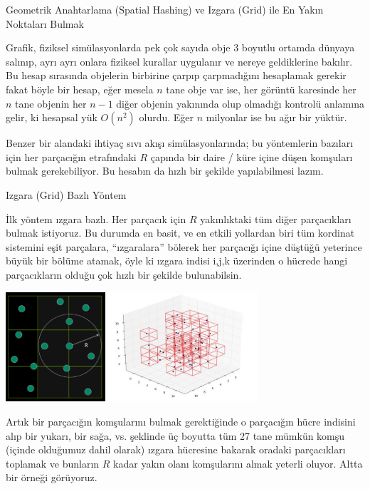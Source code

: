 \documentclass[12pt,fleqn]{article}\usepackage{../../common}
\begin{document}
Geometrik Anahtarlama (Spatial Hashing) ve Izgara (Grid) ile En Yakın Noktaları Bulmak

Grafik, fiziksel simülasyonlarda pek çok sayıda obje 3 boyutlu ortamda dünyaya
salınıp, ayrı ayrı onlara fiziksel kurallar uygulanır ve nereye geldiklerine
bakılır. Bu hesap sırasında objelerin birbirine çarpıp çarpmadığını hesaplamak
gerekir fakat böyle bir hesap, eğer mesela $n$ tane obje var ise, her görüntü
karesinde her $n$ tane objenin her $n-1$ diğer objenin yakınında olup olmadığı
kontrolü anlamına gelir, ki hesapsal yük $O(n^2)$ olurdu. Eğer $n$ milyonlar ise
bu ağır bir yüktür.

Benzer bir alandaki ihtiyaç sıvı akışı simülasyonlarında; bu yöntemlerin
bazıları için her parçacığın etrafındaki $R$ çapında bir daire / küre içine
düşen komşuları bulmak gerekebiliyor. Bu hesabın da hızlı bir şekilde
yapılabilmesi lazım.

Izgara (Grid) Bazlı Yöntem

İlk yöntem ızgara bazlı. Her parçacık için $R$ yakınlıktaki tüm diğer
parçacıkları bulmak istiyoruz. Bu durumda en basit, ve en etkili yollardan biri
tüm kordinat sistemini eşit parçalara, ``ızgaralara'' bölerek her parçacığı
içine düştüğü yeterince büyük bir bölüme atamak, öyle ki ızgara indisi i,j,k
üzerinden o hücrede hangi parçacıkların olduğu çok hızlı bir şekilde
bulunabilsin.

\includegraphics[width=10em]{algs_073_hash_03.png}
\includegraphics[width=15em]{algs_073_hash_04.jpg}

Artık bir parçacığın komşularını bulmak gerektiğinde o parçacığın hücre indisini
alıp bir yukarı, bir sağa, vs. şeklinde üç boyutta tüm 27 tane mümkün komşu
(içinde olduğumuz dahil olarak) ızgara hücresine bakarak oradaki parçacıkları
toplamak ve bunların $R$ kadar yakın olanı komşularını almak yeterli
oluyor. Altta bir örneği görüyoruz.
\end{document}
